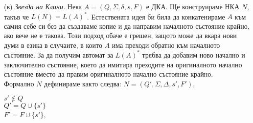 \documentclass[openany]{book}
\begin{document}
    \begin{center}
        \end{center}
    
    \vspace{15pt}
    
    (в) \textit{Звезда на Клини.} Нека $A = (Q,\Sigma,\delta,s,F)$ е ДКА. Ще конструираме
    НКА $N$, такъв че $L(N) = L(A)^*$. Естествената идея би била да конкатенираме 
    $A$ към самия себе си без да създаваме копие и да направим началното състояние крайно, ако вече не е 
    такова. Този подход обаче е грешен, защото може да вкара нови думи в езика в случаите,
    в които $A$ има преходи обратно към началното състояние.
    За да получим автомат за $L(A)^*$ трябва да добавим ново начално и заключително състояние,
    което да имитира преходите на оригиналното начално състояние вместо да правим оригиналното
    начално състояние крайно. \\
    
    \hspace{15pt} Формално $N$ дефинираме както следва:
         $N = (Q',\Sigma,\Delta,s',F')$,
         \begin{center}
          $s' \notin Q$ \\
          $Q' = Q \cup \{s'\}$ \\
          $F' = F \cup \{s'\}$,
         \end{center} 
          
\end{document}

